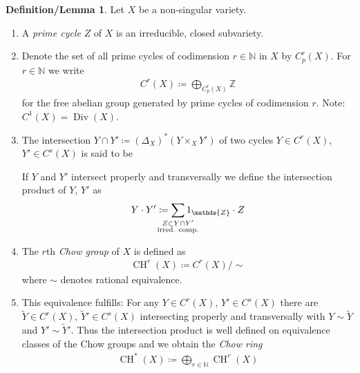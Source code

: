 \documentclass[english]{scrartcl}
\theoremstyle{definition}
\newtheorem{DefLem}[Def]{Definition/Lemma}
\theoremstyle{remark}
\newcommand*{\N}{\mathds{N}}
\newcommand*{\Z}{\mathds{Z}}
\DeclareMathOperator{\codim}{codim} %
\newcommand*{\intProd}[2]{{#1\cdot#2}} %
\newcommand*{\Diag}[1]{{\Delta_{#1}}} %
\DeclareMathOperator{\CH}{CH} %
\DeclareMathOperator{\Div}{Div} %
\begin{document}
\begin{DefLem}
  Let $X$ be a non-singular variety.
  \begin{enumerate}
  \item A \emph{prime cycle} $Z$ of $X$ is an irreducible, closed
    subvariety.
  \item Denote the set of all prime cycles of codimension
    $r\in\N$ in $X$ by $C_p^r(X)$.
    For $r\in\N$ we write
    \begin{gather*}
      C^r(X) \coloneqq \bigoplus_{C_p^r(X)}\Z
    \end{gather*}
    for the free abelian group generated by prime cycles of
    codimension $r$.
    Note: $C^1(X)=\Div(X)$.
  \item The intersection
    $Y\cap Y'\coloneqq (\Diag{X})^*(Y\times_X Y')$ of two cycles 
    $Y\in C^r(X)$, $Y'\in C^s(X)$ is said to be
    If $Y$ and $Y'$ intersect properly and transversally we define
    the intersection product of $Y$, $Y'$ as
    \begin{gather*}
      \intProd{Y}{Y'} \coloneqq
      \sum_{\mathclap{
          \substack{Z\subset Y\cap Y'\\
            \text{irred. comp.}
          }}} 1_\Z\cdot Z
    \end{gather*}
  \item The $r$th \emph{Chow group} of $X$ is defined as
    \begin{gather*}
      \CH^r(X) \coloneqq C^r(X)/\sim
    \end{gather*}
    where $\sim$ denotes rational equivalence.
  \item This equivalence  fulfills:
    For any $Y\in C^r(X)$, $Y'\in C^s(X)$ there are
    $\widetilde Y\in C^r(X)$, $\widetilde Y'\in C^s(X)$ intersecting
    properly and transversally with $Y\sim\widetilde Y$ and
    $Y'\sim\widetilde Y'$.
    Thus the intersection product is well defined on equivalence
    classes of the Chow groups and we obtain the \emph{Chow ring}
    \begin{gather*}
      \CH^*(X) \coloneqq \bigoplus_{r\in\N} \CH^r(X)
    \end{gather*}
  \end{enumerate}
\end{DefLem}
\end{document}
